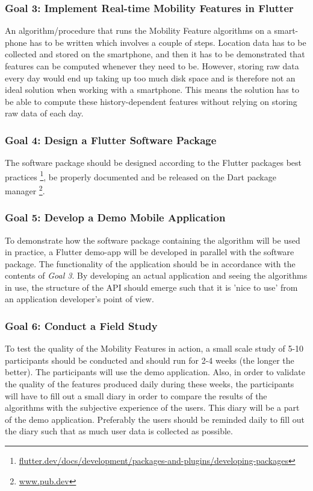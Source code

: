 \subsubsection*{Goal 3: Implement Real-time Mobility Features in Flutter}
An algorithm/procedure that runs the Mobility Feature algorithms on a smart-phone has to be written which involves a couple of steps. Location data has to be collected and stored on the smartphone, and then it has to be demonstrated that features can be computed whenever they need to be. However, storing raw data every day would end up taking up too much disk space and is therefore not an ideal solution when working with a smartphone. This means the solution has to be able to compute these history-dependent features without relying on storing raw data of each day.

\subsubsection*{Goal 4: Design a Flutter Software Package}
The software package should be designed according to the Flutter packages best practices \footnote{\url{flutter.dev/docs/development/packages-and-plugins/developing-packages}}, be properly documented and be released on the Dart package manager \footnote{\url{www.pub.dev}}.

\subsubsection*{Goal 5: Develop a Demo Mobile Application}
To demonstrate how the software package containing the algorithm will be used in practice, a Flutter demo-app will be developed in parallel with the software package. The functionality of the application should be in accordance with the contents of \textit{Goal 3}. By developing an actual application and seeing the algorithms in use, the structure of the API should emerge such that it is 'nice to use' from an application developer's point of view.

\subsubsection*{Goal 6: Conduct a Field Study}
To test the quality of the Mobility Features in action, a small scale study of 5-10 participants should be conducted and should run for 2-4 weeks (the longer the better). The participants will use the demo application. Also, in order to validate the quality of the features produced daily during these weeks, the participants will have to fill out a small diary in order to compare the results of the algorithms with the subjective experience of the users. This diary will be a part of the demo application. Preferably the users should be reminded daily to fill out the diary such that as much user data is collected as possible.

